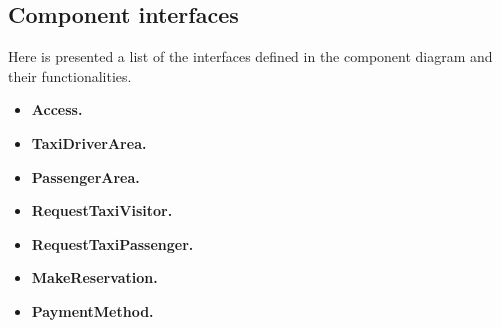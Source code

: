 		\subsection{Component interfaces}
		Here is presented a list of the interfaces defined in the component diagram and their functionalities.
		\begin{itemize}
			\item \textbf{Access.}
			\item \textbf{TaxiDriverArea.}
			\item \textbf{PassengerArea.}
			\item \textbf{RequestTaxiVisitor.}
			\item \textbf{RequestTaxiPassenger.}
			\item \textbf{MakeReservation.}
			\item \textbf{PaymentMethod.}
		\end{itemize}
	\newpage
